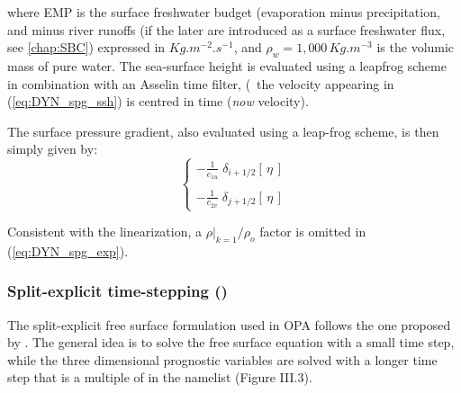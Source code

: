 \documentclass[../main/NEMO_manual]{subfiles}
\begin{document}
where EMP is the surface freshwater budget (evaporation minus precipitation, and minus river runoffs
(if the later are introduced as a surface freshwater flux, see \autoref{chap:SBC}) expressed in $Kg.m^{-2}.s^{-1}$,
and $\rho_w =1,000\,Kg.m^{-3}$ is the volumic mass of pure water.
The sea-surface height is evaluated using a leapfrog scheme in combination with an Asselin time filter,
(\ie\ the velocity appearing in (\autoref{eq:DYN_spg_ssh}) is centred in time (\textit{now} velocity).

The surface pressure gradient, also evaluated using a leap-frog scheme, is then simply given by:
\begin{equation}
  \label{eq:MBZ_dynspg_exp}
  \left\{
    \begin{aligned}
      - \frac{1}    						{e_{1u}} \;	\delta_{i+1/2} \left[  \,\eta\,  \right] \\ \\
      - \frac{1}    						{e_{2v}} \;	\delta_{j+1/2} \left[  \,\eta\,  \right]
    \end{aligned}
  \right.
\end{equation}

Consistent with the linearization, a $\left. \rho \right|_{k=1} / \rho_o$ factor is omitted in
(\autoref{eq:DYN_spg_exp}).

\subsubsection[Split-explicit time-stepping (\texttt{\textbf{key\_dynspg\_ts}})]{Split-explicit time-stepping (\protect{})}
\label{subsec:MBZ_dyn_spg_ts}

The split-explicit free surface formulation used in OPA follows the one proposed by \citet{Griffies2004?}.
The general idea is to solve the free surface equation with a small time step,
while the three dimensional prognostic variables are solved with a longer time step that
is a multiple of  in the  namelist (Figure III.3).
\end{document}
